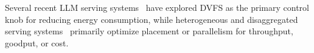 Several recent LLM serving systems~\cite{huang2026reducing,ye2025greenllm,wang2025asplos} have explored DVFS as the primary control knob for reducing energy consumption, while heterogeneous and disaggregated serving systems~\cite{patel2024splitwise,zhong2024distserve,liu2025hetis,griggs2024melange} primarily optimize placement or parallelism for throughput, goodput, or cost.

